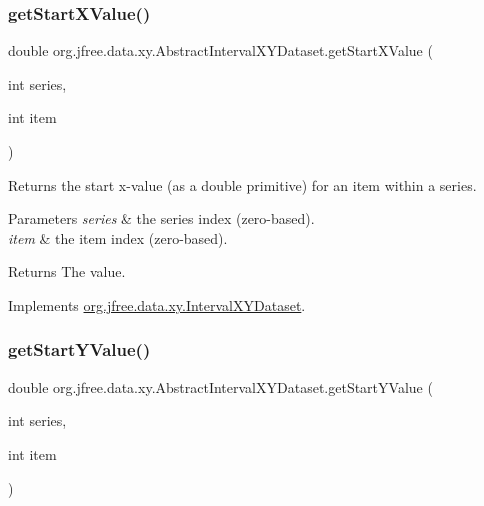 \subsubsection{\texorpdfstring{get\+Start\+X\+Value()}{getStartXValue()}}
{\footnotesize\ttfamily double org.\+jfree.\+data.\+xy.\+Abstract\+Interval\+X\+Y\+Dataset.\+get\+Start\+X\+Value (\begin{DoxyParamCaption}\item[{int}]{series,  }\item[{int}]{item }\end{DoxyParamCaption})}

Returns the start x-\/value (as a double primitive) for an item within a series.


\begin{DoxyParams}{Parameters}
{\em series} & the series index (zero-\/based). \\
\hline
{\em item} & the item index (zero-\/based).\\
\hline
\end{DoxyParams}
\begin{DoxyReturn}{Returns}
The value. 
\end{DoxyReturn}


Implements \mbox{\hyperlink{interfaceorg_1_1jfree_1_1data_1_1xy_1_1_interval_x_y_dataset_a437afe7f637a8d16ad305023a7819eef}{org.\+jfree.\+data.\+xy.\+Interval\+X\+Y\+Dataset}}.

\mbox{\label{classorg_1_1jfree_1_1data_1_1xy_1_1_abstract_interval_x_y_dataset_a93b54cecb442bfe1e268d75c1e9a0fee}} 
\subsubsection{\texorpdfstring{get\+Start\+Y\+Value()}{getStartYValue()}}
{\footnotesize\ttfamily double org.\+jfree.\+data.\+xy.\+Abstract\+Interval\+X\+Y\+Dataset.\+get\+Start\+Y\+Value (\begin{DoxyParamCaption}\item[{int}]{series,  }\item[{int}]{item }\end{DoxyParamCaption})}

